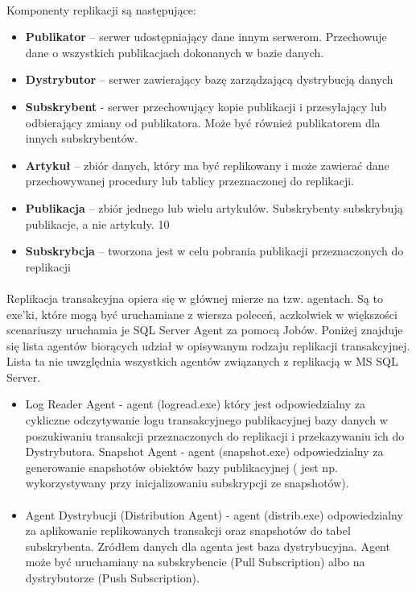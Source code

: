 \documentclass{article}
\begin{document}
\paragraph{}
Komponenty replikacji są następujące:
	\begin{itemize}
\item	\textbf{Publikator} – serwer udostępniający dane innym serwerom. Przechowuje dane o wszystkich publikacjach dokonanych w bazie danych.
\item	\textbf{Dystrybutor} – serwer zawierający bazę zarządzającą dystrybucją danych
\item	\textbf{Subskrybent} - serwer przechowujący kopie publikacji i przesyłający lub odbierający zmiany od publikatora. Może być również publikatorem dla innych subskrybentów.
\item	\textbf{Artykuł} – zbiór danych, który ma być replikowany i może zawierać dane przechowywanej procedury lub tablicy przeznaczonej do replikacji.
\item	\textbf{Publikacja} – zbiór jednego lub wielu artykułów. Subskrybenty subskrybują publikacje, a nie artykuły.
10
\item \textbf{Subskrybcja} – tworzona jest w celu pobrania publikacji przeznaczonych do replikacji

\end{itemize}

\paragraph{}
Replikacja transakcyjna opiera się w głównej mierze na tzw. agentach. Są to exe'ki, które mogą być uruchamiane z wiersza poleceń, aczkolwiek w większości scenariuszy uruchamia je SQL Server Agent za pomocą Jobów. Poniżej znajduje się lista agentów biorących udział w opisywanym rodzaju replikacji transakcyjnej. Lista ta nie uwzględnia wszystkich agentów związanych z replikacją w MS SQL Server.
\begin{itemize}
\paragraph{}
\item 
Log Reader Agent - agent (logread.exe) który jest odpowiedzialny za cykliczne odczytywanie logu transakcyjnego publikacyjnej bazy danych w poszukiwaniu transakcji przeznaczonych do replikacji i przekazywaniu ich do Dystrybutora.
Snapshot Agent - agent (snapshot.exe) odpowiedzialny za generowanie snapshotów obiektów bazy publikacyjnej ( jest np. wykorzystywany przy inicjalizowaniu subskrypcji ze snapshotów).
\paragraph{}
\item
Agent Dystrybucji (Distribution Agent) - agent (distrib.exe) odpowiedzialny za aplikowanie replikowanych transakcji oraz snapshotów do tabel subskrybenta. Zródłem danych dla agenta jest baza dystrybucyjna. Agent może być uruchamiany na subskrybencie (Pull Subscription) albo na dystrybutorze (Push Subscription).
\end{itemize}
\end{document}
